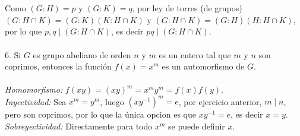 \documentclass{article}
\begin{document}
\\
\\
Como $(G:H)=p$ y $(G:K)=q$, por ley de torres (de grupos) $(G:H\cap K)=(G:K)(K: H \cap K)$ y $(G:H \cap K)=(G:H)(H: H \cap K)$, por lo que $p,q \mid (G: H \cap K)$, es decir $pq \mid (G: H \cap K)$.
\\
\\
6. Si $G$ es grupo abeliano de orden $n$ y $m$ es un entero tal que $m$ y $n$ son coprimos, entonces la función $f(x)=x^{m}$ es un automorfismo de $G$.
\\
\\
\textit{Homomorfismo:} $f(xy)=(xy)^{m}=x^{m}y^{m}=f(x)f(y)$.
\\
\textit{Inyectividad:} Sea $x^{m}=y^{m}$, luego $(xy^{-1})^{m}=e$, por
ejercicio anterior, $m \mid n$, pero son coprimos, por lo que la única opcion es que $xy^{-1}=e$, es decir $x=y$.
\\
\textit{Sobreyectividad:} Directamente para todo $x^{m}$ se puede definir $x$.
\end{document}
